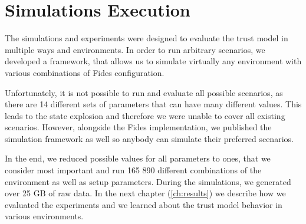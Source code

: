 \section{Simulations Execution}
\label{sec:simulations-execution}
The simulations and experiments were designed to evaluate the trust model in multiple ways and environments.
In order to run arbitrary scenarios, we developed a framework, that allows us to simulate virtually any environment with various combinations of Fides configuration.

Unfortunately, it is not possible to run and evaluate all possible scenarios, as there are 14 different sets of parameters that can have many different values.
This leads to the state explosion and therefore we were unable to cover all existing scenarios. 
However, alongside the Fides implementation, we published the simulation framework as well so anybody can simulate their preferred scenarios.

In the end, we reduced possible values for all parameters to ones, that we consider most important and run 165 890 different combinations of the environment as well as setup parameters.
During the simulations, we generated over 25 GB of raw data.
In the next chapter (\ref{ch:results}) we describe how we evaluated the experiments and we learned about the trust model behavior in various environments.